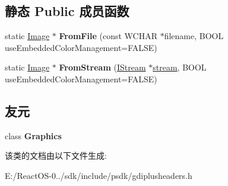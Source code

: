 \subsection*{静态 Public 成员函数}
\begin{DoxyCompactItemize}
\item 
\mbox{\label{class_image_a34d4c4566f4ede9f920583171beb8b25}} 
static \hyperlink{class_image}{Image} $\ast$ {\bfseries From\+File} (const W\+C\+H\+AR $\ast$filename, B\+O\+OL use\+Embedded\+Color\+Management=F\+A\+L\+SE)
\item 
\mbox{\label{class_image_a52ce62c7a23af0a9cb6591649c505588}} 
static \hyperlink{class_image}{Image} $\ast$ {\bfseries From\+Stream} (\hyperlink{interface_i_stream}{I\+Stream} $\ast$\hyperlink{structstream}{stream}, B\+O\+OL use\+Embedded\+Color\+Management=F\+A\+L\+SE)
\end{DoxyCompactItemize}
\subsection*{友元}
\begin{DoxyCompactItemize}
\item 
\mbox{\label{class_image_ae5cfe0c0e0b06d536d5814bd1ff4818f}} 
class {\bfseries Graphics}
\end{DoxyCompactItemize}


该类的文档由以下文件生成\+:\begin{DoxyCompactItemize}
\item 
E\+:/\+React\+O\+S-\/0../sdk/include/psdk/gdiplusheaders.\+h\end{DoxyCompactItemize}
